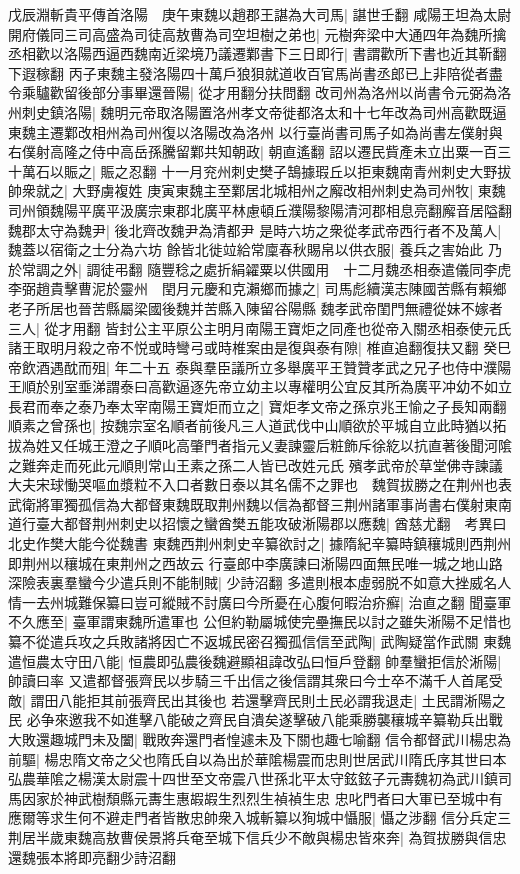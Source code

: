 戊辰淵斬貴平傳首洛陽　庚午東魏以趙郡王諶為大司馬|{
	諶世壬翻}
咸陽王坦為太尉開府儀同三司高盛為司徒高敖曹為司空坦樹之弟也|{
	元樹奔梁中大通四年為魏所擒}
丞相歡以洛陽西逼西魏南近梁境乃議遷鄴書下三日即行|{
	書謂歡所下書也近其靳翻下遐稼翻}
丙子東魏主發洛陽四十萬戶狼狽就道收百官馬尚書丞郎已上非陪從者盡令乘驢歡留後部分事畢還晉陽|{
	從才用翻分扶問翻}
改司州為洛州以尚書令元弼為洛州刺史鎮洛陽|{
	魏明元帝取洛陽置洛州孝文帝徙都洛太和十七年改為司州高歡既逼東魏主遷鄴改相州為司州復以洛陽改為洛州}
以行臺尚書司馬子如為尚書左僕射與右僕射高隆之侍中高岳孫騰留鄴共知朝政|{
	朝直遙翻}
詔以遷民貲產未立出粟一百三十萬石以賑之|{
	賑之忍翻}
十一月兖州刺史樊子鵠據瑕丘以拒東魏南青州刺史大野拔帥衆就之|{
	大野虜複姓}
庚寅東魏主至鄴居北城相州之廨改相州刺史為司州牧|{
	東魏司州領魏陽平廣平汲廣宗東郡北廣平林慮頓丘濮陽黎陽清河郡相息亮翻廨音居隘翻}
魏郡太守為魏尹|{
	後北齊改魏尹為清都尹}
是時六坊之衆從孝武帝西行者不及萬人|{
	魏蓋以宿衛之士分為六坊}
餘皆北徙竝給常廩春秋賜帛以供衣服|{
	養兵之害始此}
乃於常調之外|{
	調徒弔翻}
隨豐稔之處折絹糴粟以供國用　十二月魏丞相泰遣儀同李虎李弼趙貴擊曹泥於靈州　閏月元慶和克瀨鄉而據之|{
	司馬彪續漢志陳國苦縣有賴鄉老子所居也晉苦縣屬梁國後魏并苦縣入陳留谷陽縣}
魏孝武帝閨門無禮從妹不嫁者三人|{
	從才用翻}
皆封公主平原公主明月南陽王寶炬之同產也從帝入關丞相泰使元氏諸王取明月殺之帝不悦或時彎弓或時椎案由是復與泰有隙|{
	椎直追翻復扶又翻}
癸巳帝飲酒遇酖而殂|{
	年二十五}
泰與羣臣議所立多舉廣平王贊贊孝武之兄子也侍中濮陽王順於别室埀涕謂泰曰高歡逼逐先帝立幼主以專權明公宜反其所為廣平冲幼不如立長君而奉之泰乃奉太宰南陽王寶炬而立之|{
	寶炬孝文帝之孫京兆王愉之子長知兩翻}
順素之曾孫也|{
	按魏宗室名順者前後凡三人道武伐中山順欲於平城自立此時猶以拓拔為姓又任城王澄之子順叱高肇門者指元乂妻諫靈后粧飾斥徐紇以抗直著後聞河隂之難奔走而死此元順則常山王素之孫二人皆已改姓元氏}
殯孝武帝於草堂佛寺諫議大夫宋球慟哭嘔血漿粒不入口者數日泰以其名儒不之罪也　魏賀拔勝之在荆州也表武衛將軍獨孤信為大都督東魏既取荆州魏以信為都督三荆州諸軍事尚書右僕射東南道行臺大都督荆州刺史以招懷之蠻酋樊五能攻破淅陽郡以應魏|{
	酋慈尤翻　考異曰北史作樊大能今從魏書}
東魏西荆州刺史辛纂欲討之|{
	據隋紀辛纂時鎮穰城則西荆州即荆州以穰城在東荆州之西故云}
行臺郎中李廣諫曰淅陽四面無民唯一城之地山路深險表裏羣蠻今少遣兵則不能制賊|{
	少詩沼翻}
多遣則根本虛弱脱不如意大挫威名人情一去州城難保纂曰豈可縱賊不討廣曰今所憂在心腹何暇治疥癬|{
	治直之翻}
聞臺軍不久應至|{
	臺軍謂東魏所遣軍也}
公但約勒屬城使完壘撫民以討之雖失淅陽不足惜也纂不從遣兵攻之兵敗諸將因亡不返城民密召獨孤信信至武陶|{
	武陶疑當作武關}
東魏遣恒農太守田八能|{
	恒農即弘農後魏避顯祖諱改弘曰恒戶登翻}
帥羣蠻拒信於淅陽|{
	帥讀曰率}
又遣都督張齊民以步騎三千出信之後信謂其衆曰今士卒不滿千人首尾受敵|{
	謂田八能拒其前張齊民出其後也}
若還擊齊民則土民必謂我退走|{
	土民謂淅陽之民}
必争來邀我不如進擊八能破之齊民自潰矣遂擊破八能乘勝襲穰城辛纂勒兵出戰大敗還趣城門未及闔|{
	戰敗奔還門者惶遽未及下關也趣七喻翻}
信令都督武川楊忠為前驅|{
	楊忠隋文帝之父也隋氏自以為出於華隂楊震而忠則世居武川隋氏序其世曰本弘農華隂之楊漢太尉震十四世至文帝震八世孫北平太守鉉鉉子元夀魏初為武川鎮司馬因家於神武樹頹縣元夀生惠嘏嘏生烈烈生禎禎生忠}
忠叱門者曰大軍已至城中有應爾等求生何不避走門者皆散忠帥衆入城斬纂以狥城中懾服|{
	懾之涉翻}
信分兵定三荆居半歲東魏高敖曹侯景將兵奄至城下信兵少不敵與楊忠皆來奔|{
	為賀拔勝與信忠還魏張本將即亮翻少詩沼翻}


